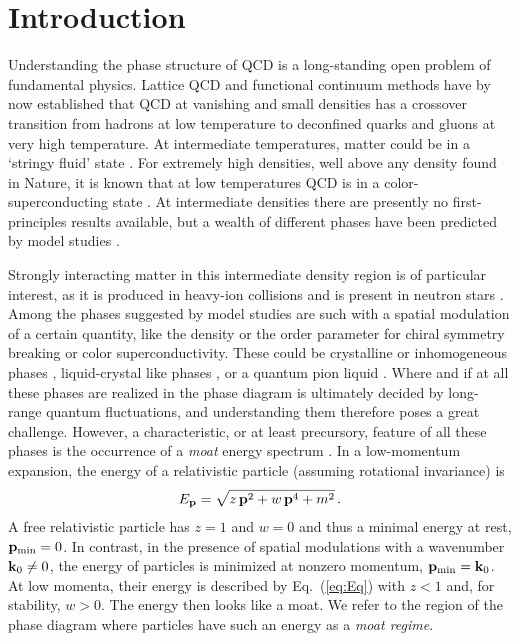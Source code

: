 \documentclass[reprint,superscriptaddress,english,preprintnumbers,amsmath,amssymb,aps,prx]{revtex4-2}
\def\Eq#1{Eq.~(\ref{#1})}
\begin{document}
\section{Introduction}\label{sec:intro}

 Understanding the phase structure of QCD is a long-standing open problem of fundamental physics. Lattice QCD \cite{Aoki:2006we, Borsanyi:2010bp,HotQCD:2018pds} and functional continuum methods \cite{Fischer:2018sdj,Fu:2019hdw,Gao:2020fbl} have by now established that QCD at vanishing and small densities has a crossover transition from hadrons at low temperature to deconfined quarks and gluons at very high temperature. At intermediate temperatures, matter could be in a `stringy fluid' state \cite{Glozman:2022lda}. For extremely high densities, well above any density found in Nature, it is known that at low temperatures QCD is in a color-superconducting state \cite{Son:1998uk, Pisarski:1999tv, Alford:2007xm}. At intermediate densities there are presently no first-principles results available, but a wealth of different phases have been predicted by model studies \cite{Fukushima:2010bq}.

Strongly interacting matter in this intermediate density region is of particular interest, as it is produced in heavy-ion collisions and is present in neutron stars \cite{Lovato:2022vgq}. Among the phases suggested by model studies are such with a spatial modulation of a certain quantity, like the density or the order parameter for chiral symmetry breaking or color superconductivity. These could be crystalline or inhomogeneous phases \cite{Fukushima:2010bq, Buballa:2014tba},  liquid-crystal like phases \cite{Lee:2015bva, Hidaka:2015xza, Pisarski:2018bct}, or a quantum pion liquid \cite{Pisarski:2020dnx,Pisarski:2021aoz}. Where and if at all these phases are realized in the phase diagram is ultimately decided by long-range quantum fluctuations, and understanding them therefore poses a great challenge. However, a characteristic, or at least precursory, feature of all these phases is the occurrence of a \emph{moat} energy spectrum \cite{Pisarski:2020dnx,Pisarski:2021qof,Rennecke:2021ovl}. In a low-momentum expansion, the energy of a relativistic particle (assuming rotational invariance) is
\begin{align}\label{eq:Eq}
E_{\bold{p}} = \sqrt{z\,\bold{p}^2 + w\,\bold{p}^4 + m^2}\,.
\end{align}
A free relativistic particle has $z=1$ and $w=0$ and thus a minimal energy at rest, $\bold{p}_{\rm min} = 0$. In contrast, in the presence of spatial modulations with a wavenumber $\bold{k}_0 \neq 0$, the energy of particles is minimized at nonzero momentum, $\bold{p}_{\rm min} = \bold{k}_0$. At low momenta, their energy is described by \Eq{eq:Eq} with $z<1$ and, for stability, $w>0$. The energy then looks like a moat. We refer to the region of the phase diagram where particles have such an energy as a \emph{moat regime}.
\end{document}
